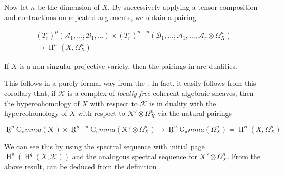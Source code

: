 Now let $n$ be the dimension of $X$.
By successively applying a tensor composition  and contractions  on repeated arguments, we obtain a pairing

\begin{equation}\tag{8.6}\label{fga1-equation-8.6}
  \begin{aligned}
    (T_r^s)^p(\mathcal{A}_1,\ldots;\mathcal{B}_1,\ldots)
    \times (T_r^s)^{n-p}(\mathcal{B}_1,\ldots;\mathcal{A}_1,\ldots,\mathcal{A}_r\otimes\Omega_X^n)
    \\\to\operatorname{H}^n(X,\Omega_X^n)
  \end{aligned}
\end{equation}

\begin{theorem}\label{fga1-theorem-6}
  If $X$ is a non-singular projective variety, then the pairings in  are dualities.
\end{theorem}

\begin{cproof}

  This follows in a purely formal way from the .
  In fact, it easily follows from this corollary that, if $\mathcal{K}$ is a complex of \emph{locally-free} coherent algebraic sheaves, then the hypercohomology of $X$ with respect to $\mathcal{K}$ is in duality with the hypercohomology of $X$ with respect to $\mathcal{K}'\otimes\Omega_X^n$ via the natural pairings

  \begin{equation}\tag{8.7}\label{fga1-equation-8.7}
    \underline{\operatorname{R}}^p\operatorname{G_a}mma(\mathcal{K})
    \times \underline{\operatorname{R}}^{n-p}\operatorname{G_a}mma(\mathcal{K}'\otimes\Omega_X^n)
    \to \underline{\operatorname{R}}^n\operatorname{G_a}mma(\Omega_X^n)
    = \operatorname{H}^n(X,\Omega_X^n)
  \end{equation}

  We can see this by using the spectral sequence with initial page $\operatorname{H}^p(\operatorname{H}^q(X,\mathcal{K}))$ and the analogous spectral sequence for $\mathcal{K}'\otimes\Omega_X^n$.
  From the above result,  can be deduced from the definition .
\end{cproof}

